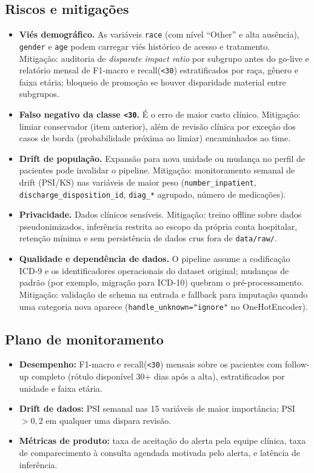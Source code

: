 \documentclass[12pt,a4paper]{article}
\begin{document}
\subsection{Riscos e mitigações}
\begin{itemize}
  \item \textbf{Viés demográfico.} As variáveis \texttt{race} (com nível ``Other'' e alta ausência), \texttt{gender} e \texttt{age} podem carregar viés histórico de acesso e tratamento. Mitigação: auditoria de \emph{disparate impact ratio} por subgrupo antes do go-live e relatório mensal de F1-macro e recall(\texttt{<30}) estratificados por raça, gênero e faixa etária; bloqueio de promoção se houver disparidade material entre subgrupos.
  \item \textbf{Falso negativo da classe \texttt{<30}.} É o erro de maior custo clínico. Mitigação: limiar conservador (item anterior), além de revisão clínica por exceção dos casos de borda (probabilidade próxima ao limiar) encaminhados ao time.
  \item \textbf{Drift de população.} Expansão para nova unidade ou mudança no perfil de pacientes pode invalidar o pipeline. Mitigação: monitoramento semanal de drift (PSI/KS) nas variáveis de maior peso (\texttt{number\_inpatient}, \texttt{discharge\_disposition\_id}, \texttt{diag\_*} agrupado, número de medicações).
  \item \textbf{Privacidade.} Dados clínicos sensíveis. Mitigação: treino offline sobre dados pseudonimizados, inferência restrita ao escopo da própria conta hospitalar, retenção mínima e sem persistência de dados crus fora de \texttt{data/raw/}.
  \item \textbf{Qualidade e dependência de dados.} O pipeline assume a codificação ICD-9 e os identificadores operacionais do dataset original; mudanças de padrão (por exemplo, migração para ICD-10) quebram o pré-processamento. Mitigação: validação de schema na entrada e fallback para imputação quando uma categoria nova aparece (\texttt{handle\_unknown="ignore"} no OneHotEncoder).
\end{itemize}

\subsection{Plano de monitoramento}
\begin{itemize}
  \item \textbf{Desempenho:} F1-macro e recall(\texttt{<30}) mensais sobre os pacientes com follow-up completo (rótulo disponível 30+ dias após a alta), estratificados por unidade e faixa etária.
  \item \textbf{Drift de dados:} PSI semanal nas 15 variáveis de maior importância; PSI $>0{,}2$ em qualquer uma dispara revisão.
  \item \textbf{Métricas de produto:} taxa de aceitação do alerta pela equipe clínica, taxa de comparecimento à consulta agendada motivada pelo alerta, e latência de inferência.
\end{itemize}
\end{document}
